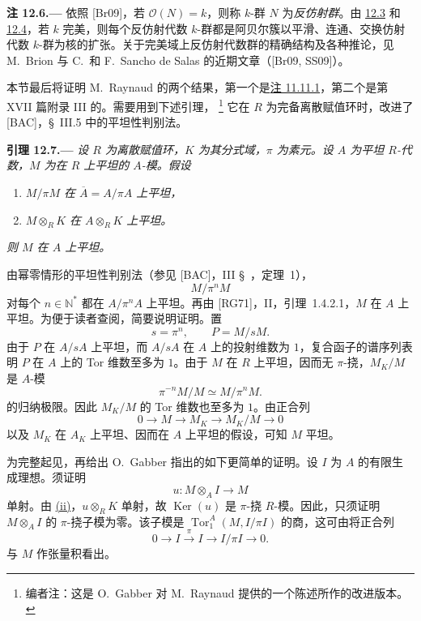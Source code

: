 \medskip
{}\label{rem:sga3-VIB-12.6}%
\noindent\textbf{注 12.6.---}
依照 \textup{[Br09]}，若 \(\mathcal O(N)=k\)，则称 \(k\)-群 \(N\) 为\emph{反仿射群}。由 \hyperref[lem:sga3-VIB-12.3]{12.3} 和 \hyperref[thm:sga3-VIB-12.4]{12.4}，若 \(k\) 完美，则每个反仿射代数 \(k\)-群都是阿贝尔簇以平滑、连通、交换仿射代数 \(k\)-群为核的扩张。关于完美域上反仿射代数群的精确结构及各种推论，见 M.~Brion 与 C.\ 和 F.~Sancho de Salas 的近期文章\textup{（[Br09, SS09]）}。

本节最后将证明 M.~Raynaud 的两个结果，第一个是\hyperref[rem:sga3-VIB-11.11.1]{注 11.11.1}，第二个是第 XVII 篇附录 III 的。需要用到下述引理，%
\footnote{\label{note:sga3-VIB-137}编者注：这是 O.~Gabber 对 M.~Raynaud 提供的一个陈述所作的改进版本。}
它在 \(R\) 为完备离散赋值环时，改进了 \textup{[BAC]}，\S~III.5 中的平坦性判别法。

\medskip
{}\label{lem:sga3-VIB-12.7}%
\noindent\textbf{引理 12.7.---}
\emph{设 \(R\) 为离散赋值环，\(K\) 为其分式域，\(\pi\) 为素元。设 \(A\) 为平坦 \(R\)-代数，\(M\) 为在 \(R\) 上平坦的 \(A\)-模。假设}
\begin{enumerate}
\item[\textup{(i)}]\label{lem:sga3-VIB-12.7-i}%
  \emph{\(M/\pi M\) 在 \(\overline A=A/\pi A\) 上平坦，}

\item[\textup{(ii)}]\label{lem:sga3-VIB-12.7-ii}%
  \emph{\(M\otimes_RK\) 在 \(A\otimes_RK\) 上平坦。}
\end{enumerate}
\emph{则 \(M\) 在 \(A\) 上平坦。}

由幂零情形的平坦性判别法\textup{（参见 [BAC]，III \S~，定理~1）}，
\[
  M/\pi^nM
\]
对每个 \(n\in\mathbb N^*\) 都在 \(A/\pi^nA\) 上平坦。再由 \textup{[RG71]}，II，引理~1.4.2.1，\(M\) 在 \(A\) 上平坦。为便于读者查阅，简要说明证明。置
\[
  s=\pi^n,\qquad P=M/sM.
\]
由于 \(P\) 在 \(A/sA\) 上平坦，而 \(A/sA\) 在 \(A\) 上的投射维数为 \(1\)，复合函子的谱序列表明 \(P\) 在 \(A\) 上的 Tor 维数至多为 \(1\)。由于 \(M\) 在 \(R\) 上平坦，因而无 \(\pi\)-挠，\(M_K/M\) 是 \(A\)-模
\[
  \pi^{-n}M/M\simeq M/\pi^nM.
\]
的归纳极限。因此 \(M_K/M\) 的 Tor 维数也至多为 \(1\)。由正合列
\label{form:sga3-VIB-12.7-MK-exact-sequence}%
\[
  0\longrightarrow M\longrightarrow M_K
    \longrightarrow M_K/M\longrightarrow0
\]
以及 \(M_K\) 在 \(A_K\) 上平坦、因而在 \(A\) 上平坦的假设，可知 \(M\) 平坦。

为完整起见，再给出 O.~Gabber 指出的如下更简单的证明。设 \(I\) 为 \(A\) 的有限生成理想。须证明
\[
  u:M\otimes_AI\longrightarrow M
\]
单射。由 \hyperref[lem:sga3-VIB-12.7-ii]{\textup{(ii)}}，\(u\otimes_RK\) 单射，故 \(\operatorname{Ker}(u)\) 是 \(\pi\)-挠 \(R\)-模。因此，只须证明 \(M\otimes_AI\) 的 \(\pi\)-挠子模为零。该子模是 \(\operatorname{Tor}_1^A(M,I/\pi I)\) 的商，这可由将正合列
\label{form:sga3-VIB-12.7-I-exact-sequence}%
\[
  0\longrightarrow I\xrightarrow{\ \pi\ }I
    \longrightarrow I/\pi I\longrightarrow0.
\]
与 \(M\) 作张量积看出。

